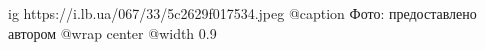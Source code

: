  
 
 
 
 

\ifcmt
  ig https://i.lb.ua/067/33/5c2629f017534.jpeg
	@caption Фото: предоставлено автором
  @wrap center
  @width 0.9
\fi
